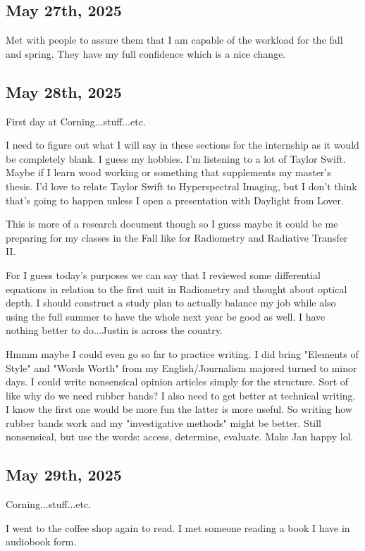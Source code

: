 \documentclass{article}
\begin{document}
\subsection{May 27th, 2025}
Met with people to assure them that I am capable of the workload for the fall and spring. They have my full confidence which is a nice change. 

\subsection{May 28th, 2025}
First day at Corning...stuff...etc.

I need to figure out what I will say in these sections for the internship as it would be completely blank. I guess my hobbies. I'm listening to a lot of Taylor Swift. Maybe if I learn wood working or something that supplements my master's thesis. I'd love to relate Taylor Swift to Hyperspectral Imaging, but I don't think that's going to happen unless I open a presentation with Daylight from Lover. 

This is more of a research document though so I guess maybe it could be me preparing for my classes in the Fall like for Radiometry and Radiative Transfer II. 

For I guess today's purposes we can say that I reviewed some differential equations in relation to the first unit in Radiometry and thought about optical depth. I should construct a study plan to actually balance my job while also using the full summer to have the whole next year be good as well. I have nothing better to do...Justin is across the country. 

Hmmm maybe I could even go so far to practice writing. I did bring "Elements of Style" and "Words Worth" from my English/Journalism majored turned to minor days. I could write nonsensical opinion articles simply for the structure. Sort of like why do we need rubber bands? I also need to get better at technical writing. I know the first one would be more fun the latter is more useful. So writing how rubber bands work and my "investigative methods" might be better. Still nonsensical, but use the words: access, determine, evaluate. Make Jan happy lol.  

\subsection{May 29th, 2025}
Corning...stuff...etc. 

I went to the coffee shop again to read. I met someone reading a book I have in audiobook form. 
\end{document}
